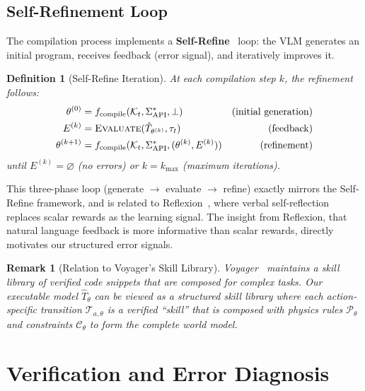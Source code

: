 \documentclass{article}
\newtheorem{definition}{Definition}
\newtheorem{remark}{Remark}
\newcommand{\calC}{\mathcal{C}}
\newcommand{\calK}{\mathcal{K}}
\newcommand{\calP}{\mathcal{P}}
\newcommand{\calT}{\mathcal{T}}
\begin{document}
\subsection{Self-Refinement Loop}
\label{sec:self_refine}

The compilation process implements a \textbf{Self-Refine}~\cite{madaan2024self} loop: the VLM generates an initial program, receives feedback (error signal), and iteratively improves it.

\begin{definition}[Self-Refine Iteration]
\label{def:self_refine}
At each compilation step $k$, the refinement follows:
\begin{align}
\theta^{(0)} &= f_{\text{compile}}(\calK_t, \Sigma^*_{\text{API}}, \bot) & \text{(initial generation)} \\
E^{(k)} &= \textsc{Evaluate}(\hat{T}_{\theta^{(k)}}, \tau_t) & \text{(feedback)} \\
\theta^{(k+1)} &= f_{\text{compile}}(\calK_t, \Sigma^*_{\text{API}}, (\theta^{(k)}, E^{(k)})) & \text{(refinement)}
\end{align}
until $E^{(k)} = \varnothing$ (no errors) or $k = k_{\max}$ (maximum iterations).
\end{definition}

This three-phase loop (generate $\to$ evaluate $\to$ refine) exactly mirrors the Self-Refine framework, and is related to Reflexion~\cite{shinn2024reflexion}, where verbal self-reflection replaces scalar rewards as the learning signal.  The insight from Reflexion, that natural language feedback is more informative than scalar rewards, directly motivates our structured error signals.

\begin{remark}[Relation to Voyager's Skill Library]
\label{rem:voyager}
Voyager~\cite{wang2024voyager} maintains a skill library of verified code snippets that are composed for complex tasks.  Our executable model $\hat{T}_\theta$ can be viewed as a structured skill library where each action-specific transition $\calT_{a,\theta}$ is a verified ``skill'' that is composed with physics rules $\calP_\theta$ and constraints $\calC_\theta$ to form the complete world model.
\end{remark}



\section{Verification and Error Diagnosis}
\label{sec:verification}
\end{document}
